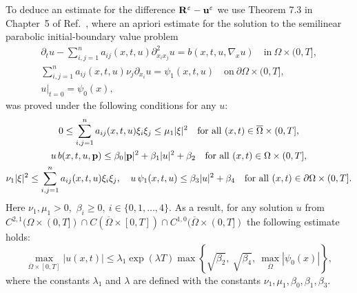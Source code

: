 \documentclass[reqno]{amsart}            %
\numberwithin{equation}{section}
\begin{document}
To deduce an estimate for the difference ${\bf R}^\varepsilon - {\bf u}^\varepsilon$ we use Theorem 7.3 in Chapter~5 of Ref.~\cite{LadColUra}, where an apriori estimate for the solution to the semilinear parabolic initial-boundary value problem
\begin{gather*}
\partial_t u - \sum\nolimits_{i,j=1}^na_{ij}(x,t,u)\partial^2_{x_i x_j}u = b(x,t,u,\nabla_x u) \quad \mbox{in} \ \Omega\times (0,T],
\\
\sum\nolimits_{i,j=1}^na_{ij}(x,t,u)\nu_j \partial_{x_i} u  = \psi_1(x,t,u) \quad \mbox{on} \ \partial\Omega\times (0,T],
\\
u|_{t=0}=\psi_0(x),
\end{gather*}
was proved under the following conditions for any $u$:
\begin{gather}\label{l-1}
0 \le \sum_{i,j=1}^na_{ij}(x,t,u) \xi_i \xi_j \le \mu_1 |{\bf \xi}|^2 \quad \text{for all}  \ (x,t)\in \overline{\Omega}\times (0,T],
\\\label{l-2}
u\, b(x,t,u, {\bf p}) \le \beta_0 |{\bf p}|^2 + \beta_1 |u|^2 + \beta_2 \quad \text{for all}  \ (x,t)\in \Omega\times (0,T],
\\\label{l-3}
\nu_1 |{\bf \xi}|^2 \le \sum_{i,j=1}^na_{ij}(x,t,u) \xi_i \xi_j, \quad
u \,\psi_1(x,t,u) \le \beta_3 |u|^2 + \beta_4 \quad \text{for all}  \ (x,t)\in \partial\Omega\times (0,T].
\end{gather}
Here $\nu_1, \mu_1 >0,$ $\beta_i\ge0, \ i\in\{0,1,\ldots,4\}.$ As a result, for any solution $u$ from $C^{2,1}(\Omega\times (0,T])\cap C(\overline{\Omega}\times [0,T])\cap C^{1,0}(\overline{\Omega}\times (0,T])$ the following estimate holds:
\begin{equation}\label{Lad-est}
  \max_{\overline{\Omega}\times [0,T]} |u(x,t)| \le \lambda_1 \exp(\lambda T) \max \left\{\sqrt{\beta_2}, \ \sqrt{\beta_4}, \ \max_{\overline{\Omega}} |\psi_0(x)| \right\},
\end{equation}
where the constants $\lambda_1$ and $\lambda$ are defined with the constants $\nu_1, \mu_1, \beta_0, \beta_1, \beta_3.$
\end{document}
